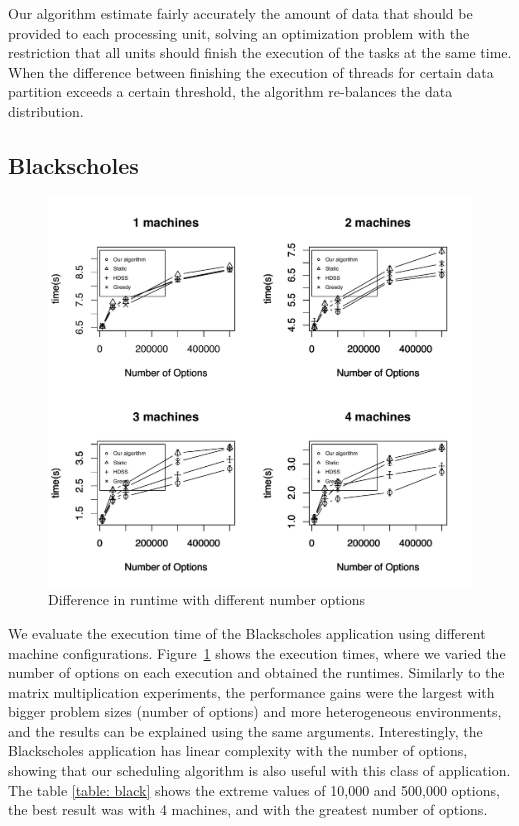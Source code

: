 \documentclass[journal]{IEEEtran}
\begin{document}
Our algorithm estimate fairly accurately the amount of data that should be
provided to each processing unit, solving an optimization problem with the
restriction that all units should finish the execution of the tasks at the same
time. When the difference between finishing the execution of threads for certain
data partition exceeds a certain threshold, the algorithm re-balances the data
distribution.

\subsection{Blackscholes}

\begin{figure}[htb]
	\begin{center}
	\centering
			\includegraphics[scale=0.45]{BlackScholes4MachinesNOVO.pdf}
	\caption{Difference in runtime with different number options}
	\label{fig:black}
	\end{center}
\end{figure}

We evaluate the execution time of the Blackscholes application using different
machine configurations. Figure~\ref{fig:black} shows the execution times, where
we varied the number of options on each execution and obtained the
runtimes. Similarly to the matrix multiplication experiments, the performance
gains were the largest with bigger problem sizes (number of options) and more
heterogeneous environments, and the results can be explained using the same
arguments. Interestingly, the Blackscholes application has linear complexity
with the number of options, showing that our scheduling algorithm is also useful
with this class of application. The table \ref{table: black} shows the extreme values ​​of 10,000 and 500,000 options, the best result was with 4 machines, and with the greatest number of options.
\end{document}
